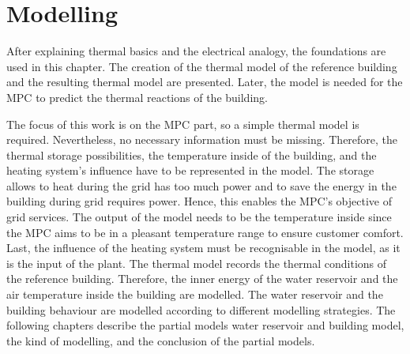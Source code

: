\chapter{Modelling}
\label{ch:modelling}
After explaining thermal basics and the electrical analogy, the foundations are used in this chapter. The creation of the thermal model of the reference building and the resulting thermal model are presented. Later, the model is needed for the MPC to predict the thermal reactions of the building.
\newline
    
    The focus of this work is on the MPC part, so a simple thermal model is required. Nevertheless, no necessary information must be missing. Therefore, the thermal storage possibilities, the temperature inside of the building, and the heating system's influence have to be represented in the model. The storage allows to heat during the grid has too much power and to save the energy in the building during grid requires power. Hence, this enables the MPC's objective of grid services. The output of the model needs to be the temperature inside since the MPC aims to be in a pleasant temperature range to ensure customer comfort. Last, the influence of the heating system must be recognisable in the model, as it is the input of the plant.
    \newline
    The thermal model records the thermal conditions of the reference building. Therefore, the inner energy of the water reservoir and the air temperature inside the building are modelled. The water reservoir and the building behaviour are modelled according to different modelling strategies. The following chapters describe the partial models water reservoir and building model, the kind of modelling, and the conclusion of the partial models.
    
